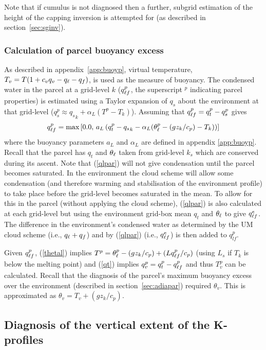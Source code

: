 \documentclass{UMDP_article}
\begin{document}
Note that if cumulus is not diagnosed then a further, subgrid
estimation of the height of the capping inversion is attempted for \zh
(as described in section~\ref{sec:sginv}).

\subsubsection{Calculation of parcel buoyancy excess}
\label{sec:parxs}

As described in appendix~\ref{app:buoyp}, virtual temperature, $T_v =
T(1 + c_v q_v - q_{\ell} - q_f)$, is used as the measure of buoyancy.  The
condensed water in the parcel at a grid-level $k$ ($q_{\ell f}^p$, the
superscript $^p$ indicating parcel properties) is estimated using a
Taylor expansion of $q_s$ about the environment at that grid-level
($q_s^p \approx {q_s}_k + \alpha_L (T^p-T_k) $).  Assuming that
$q_{\ell f}^p=q_t^p - q_s^p$ gives
\begin{equation}
  q_{\ell f}^p = \mbox{max}\left[ 0.0, \, a_L \left( q_t^p - {q_s}_k 
         - \alpha_L (\theta_{\ell}^p - (g z_k/c_p)-T_k)\right) 
  \right]
  \label{qlpar}
\end{equation}
where the buoyancy parameters $a_L$ and $\alpha_L$ are defined in
appendix \ref{app:buoyp}.  Recall that the parcel has $q_t$ and
$\theta_{\ell}$ taken from grid-level $k_s$ which are conserved during its
ascent.  Note that (\ref{qlpar}) will not give condensation until the
parcel becomes saturated.  In the environment the cloud scheme will
allow some condensation (and therefore warming and stabilisation of
the environment profile) to take place before the grid-level becomes
saturated in the mean.  To allow for this in the parcel (without
applying the cloud scheme), (\ref{qlpar}) is also calculated at each
grid-level but using the environment grid-box mean $q_t$ and $\theta_{\ell}$
to give $q_{\ell f}^e$.  The difference in the environment's condensed water
as determined by the UM cloud scheme (\mbox{i.e.}, $q_{\ell}+q_f$) and by
(\ref{qlpar}) (\mbox{i.e.}, $q_{\ell f}^e$) is then added to $q^p_{lf}$.

Given $q_{\ell f}^p$, (\ref{thetal}) implies $T^p = \theta_{\ell}^p - (g z_k/c_p)
+ (L q_{\ell f}^p/c_p)$ (using $L_s$ if $T_k$ is below the melting point)
and (\ref{qt}) implies $q_v^p = q_t^p - q_{\ell f}^p $ and thus $T_v^p$ can
be calculated.  Recall that the diagnosis of the parcel's maximum
buoyancy excess over the environment (described in
section~\ref{sec:adiapar}) required $\theta_v$.  This is approximated
as $\theta_v = T_v + (g z_k/c_p)$.

\subsection{Diagnosis of the vertical extent of the K-profiles}
\label{sec:decouple}
\end{document}
